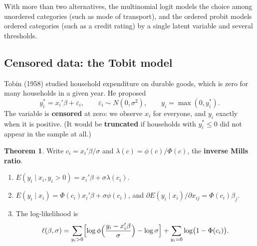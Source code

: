 \documentclass[11pt,a4paper]{article}
\numberwithin{equation}{section}
\theoremstyle{definition}
\newtheorem{thm}{Theorem}[subsection]
\begin{document}
With more than two alternatives, the multinomial logit models the choice among unordered categories (such as mode of transport), and the ordered
probit models ordered categories (such as a credit rating) by a single latent variable and several thresholds.

\subsection{Censored data: the Tobit model}
\label{ssec:tobit}

Tobin (1958) studied household expenditure on durable goods, which is zero for many households in a given year. He proposed
\[
y_i^* = x_i'\beta + \varepsilon_i, \qquad \varepsilon_i \sim N(0, \sigma^2), \qquad y_i = \max(0, y_i^*) .
\]
The variable is \textbf{censored} at zero: we observe $x_i$ for everyone, and $y_i$ exactly when it is positive. (It would be \textbf{truncated} if households with $y_i^* \leq 0$ did
not appear in the sample at all.)

\begin{thm}
\label{thm:tobit}
Write $c_i = x_i'\beta/\sigma$ and $\lambda(c) = \phi(c)/\Phi(c)$, the \textbf{inverse Mills ratio}.
\begin{enumerate}[label=(\roman*)]
\item $E(y_i \mid x_i, y_i > 0) = x_i'\beta + \sigma\lambda(c_i)$.
\item $E(y_i \mid x_i) = \Phi(c_i)x_i'\beta + \sigma\phi(c_i)$, and $\partial E(y_i \mid x_i)/\partial x_{ij} = \Phi(c_i)\beta_j$.
\item The log-likelihood is
\[
\ell(\beta, \sigma) = \sum_{y_i > 0}\Bigl[\log\phi\Bigl(\frac{y_i - x_i'\beta}{\sigma}\Bigr) - \log\sigma\Bigr] + \sum_{y_i = 0}\log\bigl(1 - \Phi(c_i)\bigr) .
\]
\end{enumerate}
\end{thm}
\end{document}
